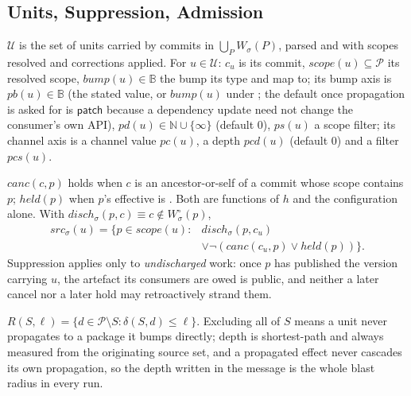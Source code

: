 \subsection{Units, Suppression, Admission}

\begin{definition}[units]
$\mathcal{U}$ is the set of units carried by commits in
$\bigcup_P W_\sigma(P)$, parsed and with scopes resolved and corrections
applied. For $u \in \mathcal{U}$: $c_u$ is its commit,
$\mathit{scope}(u) \subseteq \mathcal{P}$ its resolved scope,
$\mathit{bump}(u) \in \mathbb{B}$ the bump its type and \code{!} map to;
its bump axis is $\mathit{pb}(u) \in \mathbb{B}$ (the stated value, or
$\mathit{bump}(u)$ under ; the default once propagation is
asked for is $\mathsf{patch}$ because a dependency update need not
change the consumer's own API), $\mathit{pd}(u) \in \mathbb{N} \cup
\{\infty\}$ (default $0$), $\mathit{ps}(u)$ a scope filter; its channel
axis is a channel value $\mathit{pc}(u)$, a depth $\mathit{pcd}(u)$
(default $0$) and a filter $\mathit{pcs}(u)$.
\end{definition}

\begin{definition}
\label{def:src}
$\mathit{canc}(c,p)$ holds when $c$ is an ancestor-or-self of a
 commit whose scope contains $p$; $\mathit{held}(p)$ when
$p$'s effective  is . Both are functions of
$h$ and the configuration alone. With $\mathit{disch}_\sigma(p,c)
\equiv c \notin W^\circ_\sigma(p)$,
\begin{equation}
\begin{aligned}
  \mathit{src}_\sigma(u) = \{ p \in \mathit{scope}(u) : {}&
    \mathit{disch}_\sigma(p,c_u) \\
    &\lor\lnot(\mathit{canc}(c_u,p) \lor \mathit{held}(p)) \}.
\end{aligned}
  \label{eq:src}
\end{equation}
Suppression applies only to \emph{undischarged} work: once $p$ has
published the version carrying $u$, the artefact its consumers are owed
is public, and neither a later cancel nor a later hold may retroactively
strand them.
\end{definition}

\begin{definition}[reach]
\label{def:reach}
$R(S,\ell) = \{ d \in \mathcal{P} \setminus S : \delta(S,d) \leq \ell
\}$. Excluding all of $S$ means a unit never propagates to a package it
bumps directly; depth is shortest-path and always measured from the
originating source set, and a propagated effect never cascades its own
propagation, so the depth written in the message is the whole blast
radius in every run.
\end{definition}

